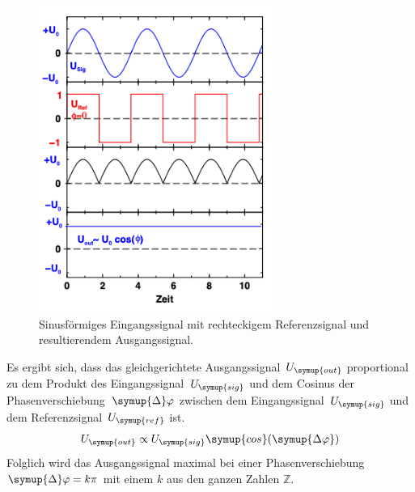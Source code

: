 \begin{figure} [H]
    \centering
    \includegraphics[height=10cm]{content/Bilder/Signalverlaeufe.png}
    \caption{Sinusförmiges Eingangssignal mit rechteckigem Referenzsignal und resultierendem %
    Ausgangssignal.\cite{v303}}
    \label{fig:Aufbau}
\end{figure}

Es ergibt sich, dass das gleichgerichtete Ausgangssignal~$U_{\symup{out}}$ proportional zu dem Produkt des 
Eingangssignal~$U_{\symup{sig}}$ und dem Cosinus der Phasenverschiebung~$\symup{\Delta}\varphi$ zwischen dem 
Eingangssignal~$U_{\symup{sig}}$ und dem Referenzsignal~$U_{\symup{ref}}$ ist.
\begin{equation}
    U_{\symup{out}} \propto U_{\symup{sig}}\symup{cos}(\symup{\Delta\varphi})
    \label{eq:Ausgangssignal Proportionalitaet}
\end{equation}
Folglich wird das Ausgangssignal maximal bei einer Phasenverschiebung $\symup{\Delta}\varphi = k\pi$ mit einem $k$ aus den ganzen
Zahlen $\mathbb{Z}$.
